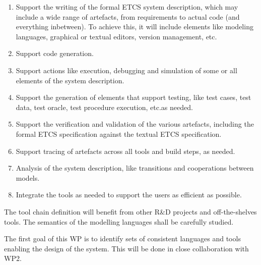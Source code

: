 \documentclass{template/openetcs_article}
\begin{document}
\begin{enumerate}
\item Support the writing of the formal ETCS system
  description, which may include a wide range of artefacts, from requirements to actual code (and everything inbetween).  To achieve this, it will include elements like modeling languages, graphical or textual editors, version management, etc.

\item Support code generation.

\item Support actions like execution, debugging and simulation of some or all elements of the system description.

\item Support the generation of elements that support testing, like test cases, test data, test oracle, test procedure execution, etc.as needed.

\item Support the verification and validation of the various artefacts, including the formal ETCS specification against the textual ETCS specification.


\item Support tracing of artefacts across all tools and build steps, as needed.

\item Analysis of the system description, like transitions and cooperations between models.

\item Integrate the tools as needed to support the users as efficient as possible.
 
\end{enumerate}

The tool chain definition will benefit from other R\&D projects and off-the-shelves tools. The semantics of the modelling languages shall be carefully studied.

The first goal of this WP is to identify sets of consistent languages and tools enabling the design of the system.  This will be done in close collaboration with WP2.
\end{document}
